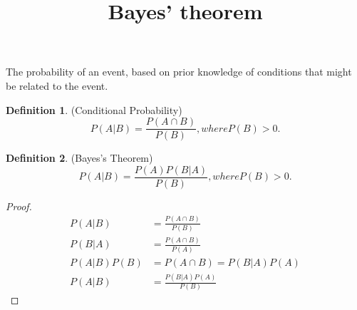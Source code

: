 \documentclass[12pt]{article}
\title{Bayes' theorem}
\theoremstyle{definition}
\newtheorem{definition}{Definition}[section]
\begin{document}
The probability of an event, based on prior knowledge of conditions that might be related to the event.
\begin{definition}(Conditional Probability)
	\[
		P(A|B) = \frac{P(A\cap B)}{P(B)}, where P(B) > 0.
	\]
\end{definition}
\begin{definition}(Bayes's Theorem)
	\[
		P(A|B) = \frac{P(A)P(B|A)}{P(B)}, where P(B) > 0.
	\]
\end{definition}
\begin{proof}
	\begin{align*}
		P(A|B) &= \frac{P(A\cap B)}{P(B)} \\
		P(B|A) &= \frac{P(A\cap B)}{P(A)} \\
		P(A|B)P(B) &= P(A\cap B) = P(B|A)P(A) \\
		P(A|B) &= \frac{P(B|A)P(A)}{P(B)}
	\end{align*}
\end{proof}
\end{document}
